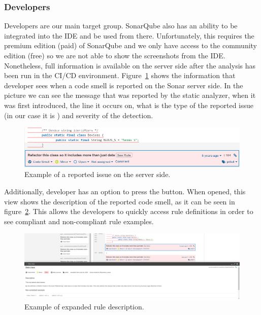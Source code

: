 \subsubsection{Developers}



Developers are our main target group.
SonarQube also has an ability to be integrated into the IDE and be used from there.
Unfortunately, this requires the premium edition (paid) of SonarQube and we only have access to the community edition (free)
so we are not able to show the screenshots from the IDE\@.
Nonetheless, full information is available on the server side after the analysis has been run in the CI/CD environment.
Figure~\ref{fig:dev_1} shows the information that developer sees when a code smell is reported on the Sonar server side.
In the picture we can see the message that was reported by the static analyzer, when it was first introduced,
the line it occurs on, what is the type of the reported issue (in our case it is ) and severity of the detection.

\begin{figure}
    \includegraphics[scale=0.5]{figures/dev_1.png}
    \caption{Example of a reported issue on the server side.}
    \label{fig:dev_1}
\end{figure}

Additionally, developer has an option to press the  button.
When opened, this view shows the description of the reported code smell, as it can be seen in figure~\ref{fig:dev_2}.
This allows the developers to quickly access rule definitions in order to see compliant and non-compliant rule examples.

\begin{figure}
    \includegraphics[scale=0.25]{figures/dev_2.png}
    \caption{Example of expanded rule description.}
    \label{fig:dev_2}
\end{figure}

